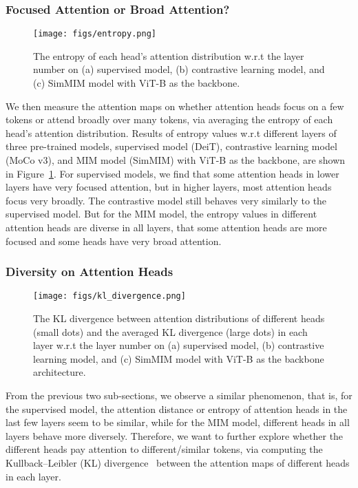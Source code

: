 \documentclass{article}
\begin{document}
\subsubsection{Focused Attention or Broad Attention?}

\begin{figure}[t]
    \centering
    \texttt{[image: figs/entropy.png]}
	    \vspace{-1.5em}
    \caption{The entropy of each head's attention distribution w.r.t the layer number on (a) supervised model, (b) contrastive learning model,  and (c) SimMIM model with ViT-B as the backbone.}
    \label{fig:entropy}
\end{figure}

We then measure the attention maps on whether attention heads focus on a few tokens or attend broadly over many tokens, via averaging the entropy of each head's attention distribution. Results of entropy values w.r.t different layers of three pre-trained models, supervised model (DeiT), contrastive learning model (MoCo v3), and MIM model (SimMIM) with ViT-B as the backbone, are shown in Figure~\ref{fig:entropy}. For supervised models, we find that some attention heads in lower layers have very focused attention, but in higher layers, most attention heads focus very broadly. The contrastive model still behaves very similarly to the supervised model. But for the MIM model, the entropy values in different attention heads are diverse in all layers, that some attention heads are more focused and some heads have very broad attention.


\subsubsection{Diversity on Attention Heads}
\label{subsubsection:diversity}

\begin{figure}
    \centering
    \texttt{[image: figs/kl\_divergence.png]}
	    \vspace{-1.5em}
    \caption{The KL divergence between attention distributions of different heads (small dots) and the averaged KL divergence (large dots) in each layer w.r.t the layer number on (a) supervised model, (b) contrastive learning model, and (c) SimMIM model with ViT-B as the backbone architecture.}
    \label{fig:kl-divergence}
\end{figure}

From the previous two sub-sections, we observe a similar phenomenon, that is, for the supervised model, the attention distance or entropy of attention heads in the last few layers seem to be similar, while for the MIM model, different heads in all layers behave more diversely. Therefore, we want to further explore whether the different heads pay attention to different/similar tokens, via computing the 
Kullback–Leibler (KL) divergence~\cite{kldivergence} between the attention maps of different heads in each layer. 
\end{document}
